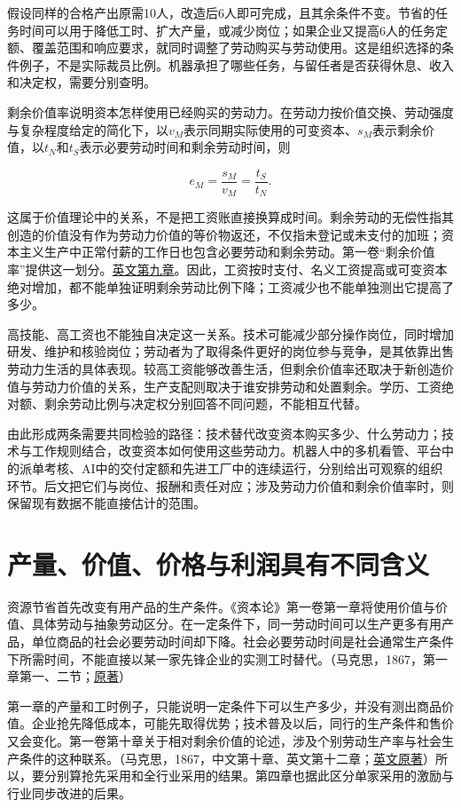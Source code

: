 \documentclass[UTF8,fontset=windows,12pt,a4paper,oneside,openany]{ctexbook}
\begin{document}
假设同样的合格产出原需10人，改造后6人即可完成，且其余条件不变。节省的任务时间可以用于降低工时、扩大产量，或减少岗位；如果企业又提高6人的任务定额、覆盖范围和响应要求，就同时调整了劳动购买与劳动使用。这是组织选择的条件例子，不是实际裁员比例。机器承担了哪些任务，与留任者是否获得休息、收入和决定权，需要分别查明。

剩余价值率说明资本怎样使用已经购买的劳动力。在劳动力按价值交换、劳动强度与复杂程度给定的简化下，以$v_M$表示同期实际使用的可变资本、$s_M$表示剩余价值，以$t_N$和$t_S$表示必要劳动时间和剩余劳动时间，则

\[
e_M=\frac{s_M}{v_M}=\frac{t_S}{t_N}.
\tag{2-V3}
\]

这属于价值理论中的关系，不是把工资账直接换算成时间。剩余劳动的无偿性指其创造的价值没有作为劳动力价值的等价物返还，不仅指未登记或未支付的加班；资本主义生产中正常付薪的工作日也包含必要劳动和剩余劳动。第一卷“剩余价值率”提供这一划分。\href{https://www.marxists.org/archive/marx/works/1867-c1/ch09.htm}{英文第九章}。因此，工资按时支付、名义工资提高或可变资本绝对增加，都不能单独证明剩余劳动比例下降；工资减少也不能单独测出它提高了多少。

高技能、高工资也不能独自决定这一关系。技术可能减少部分操作岗位，同时增加研发、维护和核验岗位；劳动者为了取得条件更好的岗位参与竞争，是其依靠出售劳动力生活的具体表现。较高工资能够改善生活，但剩余价值率还取决于新创造价值与劳动力价值的关系，生产支配则取决于谁安排劳动和处置剩余。学历、工资绝对额、剩余劳动比例与决定权分别回答不同问题，不能相互代替。

由此形成两条需要共同检验的路径：技术替代改变资本购买多少、什么劳动力；技术与工作规则结合，改变资本如何使用这些劳动力。机器人中的多机看管、平台中的派单考核、AI中的交付定额和先进工厂中的连续运行，分别给出可观察的组织环节。后文把它们与岗位、报酬和责任对应；涉及劳动力价值和剩余价值率时，则保留现有数据不能直接估计的范围。

\section{产量、价值、价格与利润具有不同含义}

资源节省首先改变有用产品的生产条件。《资本论》第一卷第一章将使用价值与价值、具体劳动与抽象劳动区分。在一定条件下，同一劳动时间可以生产更多有用产品，单位商品的社会必要劳动时间却下降。社会必要劳动时间是社会通常生产条件下所需时间，不能直接以某一家先锋企业的实测工时替代。（马克思，1867，第一章第一、二节；\href{https://www.marxists.org/archive/marx/works/1867-c1/ch01.htm}{原著}）

第一章的产量和工时例子，只能说明一定条件下可以生产多少，并没有测出商品价值。企业抢先降低成本，可能先取得优势；技术普及以后，同行的生产条件和售价又会变化。第一卷第十章关于相对剩余价值的论述，涉及个别劳动生产率与社会生产条件的这种联系。（马克思，1867，中文第十章、英文第十二章；\href{https://www.marxists.org/archive/marx/works/1867-c1/ch12.htm}{英文原著}）所以，要分别算抢先采用和全行业采用的结果。第四章也据此区分单家采用的激励与行业同步改进的后果。
\end{document}
